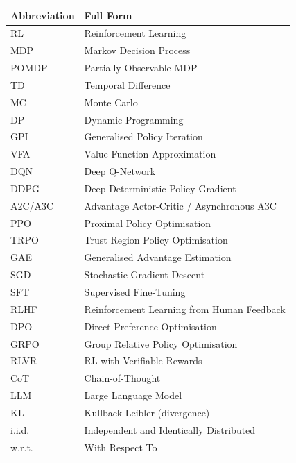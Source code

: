 \begin{center}
\begin{tabular}{@{}ll@{}}
\toprule
\textbf{Abbreviation} & \textbf{Full Form} \\
\midrule
RL     & Reinforcement Learning \\
MDP    & Markov Decision Process \\
POMDP  & Partially Observable MDP \\
TD     & Temporal Difference \\
MC     & Monte Carlo \\
DP     & Dynamic Programming \\
GPI    & Generalised Policy Iteration \\
VFA    & Value Function Approximation \\
DQN    & Deep Q-Network \\
DDPG   & Deep Deterministic Policy Gradient \\
A2C/A3C & Advantage Actor-Critic / Asynchronous A3C \\
PPO    & Proximal Policy Optimisation \\
TRPO   & Trust Region Policy Optimisation \\
GAE    & Generalised Advantage Estimation \\
SGD    & Stochastic Gradient Descent \\
SFT    & Supervised Fine-Tuning \\
RLHF   & Reinforcement Learning from Human Feedback \\
DPO    & Direct Preference Optimisation \\
GRPO   & Group Relative Policy Optimisation \\
RLVR   & RL with Verifiable Rewards \\
CoT    & Chain-of-Thought \\
LLM    & Large Language Model \\
KL     & Kullback-Leibler (divergence) \\
i.i.d. & Independent and Identically Distributed \\
w.r.t. & With Respect To \\
\bottomrule
\end{tabular}
\end{center}
